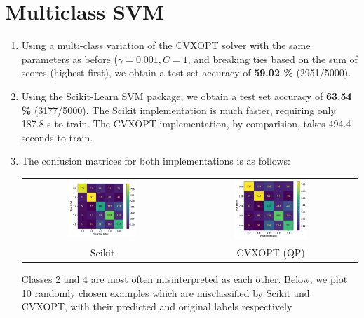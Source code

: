 \documentclass[12pt]{article}
\begin{document}
\section{Multiclass SVM}

\begin{enumerate}
    \item Using a multi-class variation of the CVXOPT solver with the same parameters as before ($\gamma = 0.001, C = 1$, and breaking ties based on the sum of scores (highest first), we obtain a test set accuracy of \textbf{59.02 \%} (2951/5000). 
    \item Using the Scikit-Learn SVM package, we obtain a test set accuracy of \textbf{63.54 \%} (3177/5000). The Scikit implementation is much faster, requiring only 187.8 s to train. The CVXOPT implementation, by comparision, takes 494.4 seconds to train.

    \item The confusion matrices for both implementations is as follows:
    \begin{center}
        \begin{tabular}{c c}
            \includegraphics[width=0.44\textwidth]{../Q3/Qc/sk_cmat.pdf} & \includegraphics[width=0.44\textwidth]{../Q3/Qc/qp_cmat.pdf} \\
            Scikit & CVXOPT (QP)
        \end{tabular}
    \end{center}

    Classes 2 and 4 are most often misinterpreted as each other. Below, we plot 10 randomly chosen examples which are misclassified by Scikit and CVXOPT, with their predicted and original labels respectively


\end{enumerate}
\end{document}
